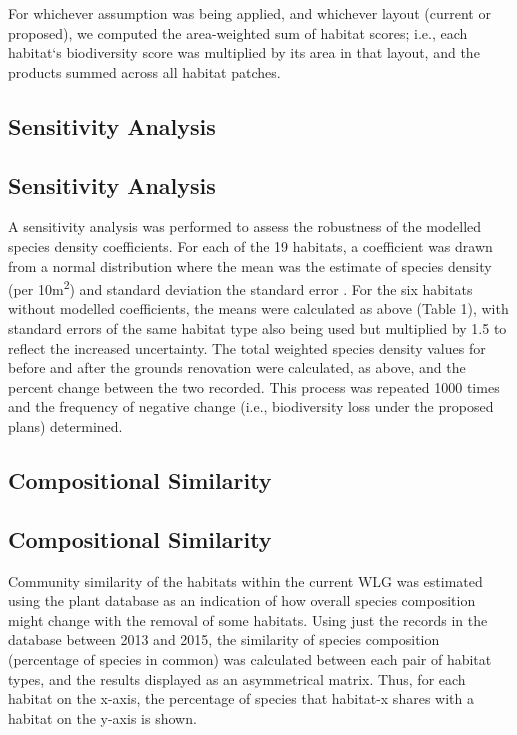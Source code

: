 For whichever assumption was being applied, and whichever layout (current or proposed), we computed the area-weighted sum of habitat scores; i.e., each habitat`s biodiversity score was multiplied by its area in that layout, and the products summed across all habitat patches.

\ifappendixStyle %
\subsection{Sensitivity Analysis}%
\else
\subsection*{Sensitivity Analysis}
\fi

A sensitivity analysis was performed to assess the robustness of the modelled species density coefficients. For each of the 19 habitats, a coefficient was drawn from a normal distribution where the mean was the estimate of species density (per 10m\textsuperscript{2}) and standard deviation the standard error \citep{Newbold:2015nat}. For the six habitats without modelled coefficients, the means were calculated as above (Table 1), with standard errors of the same habitat type also being used but multiplied by 1.5 to reflect the increased uncertainty. The total weighted species density values for before and after the grounds renovation were calculated, as above, and the percent change between the two recorded.  This process was repeated 1000 times and the frequency of negative change (i.e., biodiversity loss under the proposed plans) determined.

\ifappendixStyle %
\subsection{Compositional Similarity}%
\else
\subsection*{Compositional Similarity}
\fi

Community similarity of the habitats within the current WLG was estimated using the plant database as an indication of how overall species composition might change with the removal of some habitats.  Using just the records in the database between 2013 and 2015, the similarity of species composition (percentage of species in common) was calculated between each pair of habitat types, and the results displayed as an asymmetrical matrix. Thus, for each habitat on the x-axis, the percentage of species that habitat-x shares with a habitat on the y-axis is shown.

